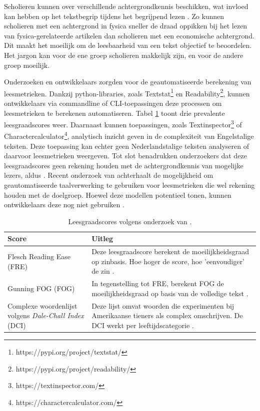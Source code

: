 Scholieren kunnen over verschillende achtergrondkennis beschikken, wat invloed kan hebben op het tekstbegrip tijdens het begrijpend lezen \autocite{DeMeyer2019}. Zo kunnen scholieren met een achtergrond in fysica sneller de draad oppikken bij het lezen van fysica-gerelateerde artikelen dan scholieren met een economische achtergrond. Dit maakt het moeilijk om de leesbaarheid van een tekst objectief te beoordelen. Het jargon kan voor de ene groep scholieren makkelijk zijn, en voor de andere groep moeilijk.

\medspace

Onderzoeken en ontwikkelaars zorgden voor de geautomatiseerde berekening van leesmetrieken. Dankzij python-libraries, zoals Textstat\footnote{https://pypi.org/project/textstat/} en Readability\footnote{https://pypi.org/project/readability/}, kunnen ontwikkelaars via commandline of CLI-toepassingen deze processen om leesmetrieken te berekenen automatiseren. Tabel \ref{table:readability-scores} toont drie prevalente leesgraadscores weer. Daarnaast kunnen toepassingen, zoals Textinspector\footnote{https://textinspector.com/} of Charactercalculator\footnote{https://charactercalculator.com/}, analytisch inzicht geven in de complexiteit van Engelstalige teksten. Deze toepassing kan echter geen Nederlandstalige teksten analyseren of daarvoor leesmetrieken weergeven. Tot slot benadrukken onderzoekers dat deze leesgraadscores geen rekening houden met de achtergrondkennis van mogelijke lezers, aldus \autocite{Cantos2019}. Recent onderzoek van \textcite{Crossley2019} achterhaalt de mogelijkheid om geautomatiseerde taalverwerking te gebruiken voor leesmetrieken die wel rekening houden met de doelgroep. Hoewel deze modellen potentieel tonen, kunnen ontwikkelaars deze nog niet gebruiken \autocite{Crossley2019}.

\begin{center}
	\begin{table}[H]
	\begin{tabular}{ | m{5cm} | m{10cm} | } 
		\hline
		\textbf{Score} & \textbf{Uitleg} \\ 
		\hline
		Flesch Reading Ease (FRE) & Deze leesgraadscore berekent de moeilijkheidsgraad op zinbasis. Hoe hoger de score, hoe 'eenvoudiger' de zin \autocite{Cantos2019, Readable2021}. \\
		\hline
		Gunning FOG (FOG) & In tegenstelling tot FRE, berekent FOG de moeilijkheidsgraad op basis van de volledige tekst \autocite{Cantos2019}. \\
		\hline
		Complexe woordenlijst volgens \textit{Dale-Chall Index} (DCI) & Deze lijst omvat woorden die experimenten bij Amerikaanse tieners als complex omschrijven. De DCI werkt per leeftijdscategorie \autocite{Cantos2019}. \\
		\hline
	\end{tabular}
	\caption{Leesgraadscores volgens onderzoek van \textcite{Cantos2019}.}
	\label{table:readability-scores}
	\end{table}
\end{center}

